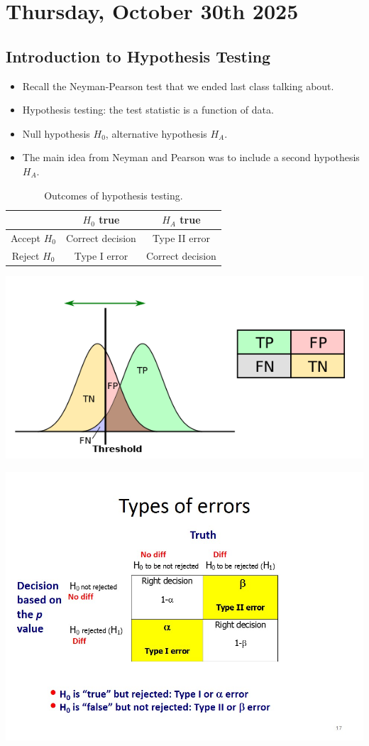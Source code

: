 \section{Thursday, October 30th 2025}

\subsection{Introduction to Hypothesis Testing}

\begin{itemize}
    \item Recall the Neyman-Pearson test that we ended last class talking about.
    \item Hypothesis testing: the test statistic is a function of data.
    \item Null hypothesis $H_0$, alternative hypothesis $H_A$.
    \item The main idea from Neyman and Pearson was to include a second hypothesis $H_A$.
\end{itemize}

\begin{table}[h]
    \centering
    \begin{tabular}{c|c|c}
                     & $H_0$ true       & $H_A$ true       \\
        \hline
        Accept $H_0$ & Correct decision & Type II error    \\
        \hline
        Reject $H_0$ & Type I error     & Correct decision \\
    \end{tabular}
    \caption{Outcomes of hypothesis testing.}
\end{table}

\includegraphics[width = 0.6\linewidth]{Images/lec15-neym-pear.png}

\includegraphics[width = \linewidth]{Images/lec15-type-errors.jpg}


